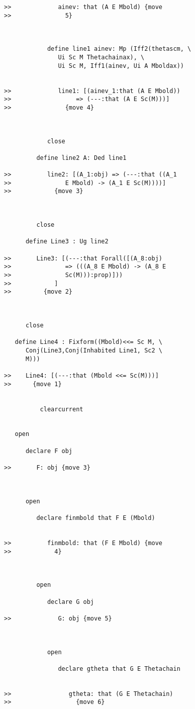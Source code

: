 \documentclass[12pt]{article}
\begin{document}
\begin{verbatim}
>>             ainev: that (A E Mbold) {move
>>               5}



            define line1 ainev: Mp (Iff2(thetascm, \
               Ui Sc M Thetachainax), \
               Ui Sc M, Iff1(ainev, Ui A Mboldax))


>>             line1: [(ainev_1:that (A E Mbold))
>>                  => (---:that (A E Sc(M)))]
>>               {move 4}



            close

         define line2 A: Ded line1

>>          line2: [(A_1:obj) => (---:that ((A_1
>>               E Mbold) -> (A_1 E Sc(M))))]
>>            {move 3}



         close

      define Line3 : Ug line2

>>       Line3: [(---:that Forall([(A_8:obj)
>>               => (((A_8 E Mbold) -> (A_8 E
>>               Sc(M))):prop)]))
>>            ]
>>         {move 2}



      close

   define Line4 : Fixform((Mbold)<<= Sc M, \
      Conj(Line3,Conj(Inhabited Line1, Sc2 \
      M)))

>>    Line4: [(---:that (Mbold <<= Sc(M)))]
>>      {move 1}


          clearcurrent


   open

      declare F obj

>>       F: obj {move 3}



      open

         declare finmbold that F E (Mbold)


>>          finmbold: that (F E Mbold) {move
>>            4}



         open

            declare G obj

>>             G: obj {move 5}



            open

               declare gtheta that G E Thetachain


>>                gtheta: that (G E Thetachain)
>>                  {move 6}




\end{verbatim}
\end{document}
